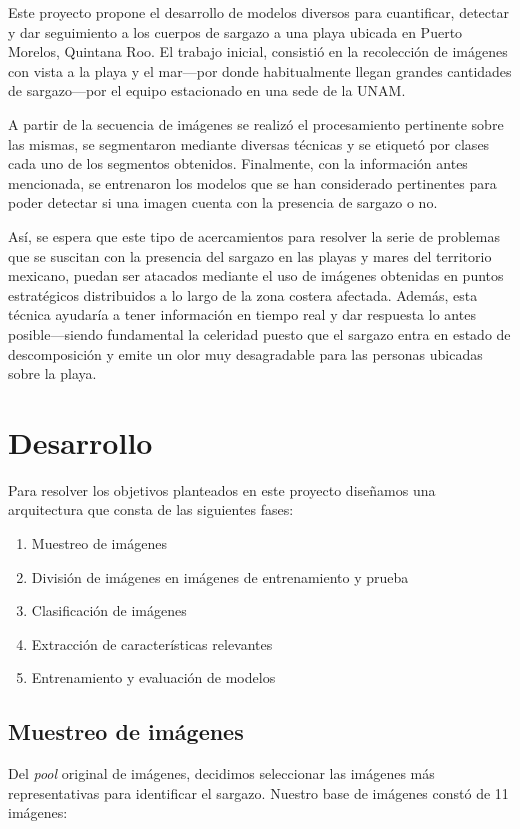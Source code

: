 \documentclass[conference]{IEEEtran}
\begin{document}
Este proyecto propone el desarrollo de modelos diversos para cuantificar, detectar y dar seguimiento a los cuerpos de sargazo a una playa ubicada en Puerto Morelos, Quintana Roo. El trabajo inicial, consistió en la recolección de imágenes con vista a la playa y el mar---por donde habitualmente llegan grandes cantidades de sargazo---por el equipo estacionado en una sede de la UNAM.

A partir de la secuencia de imágenes se realizó el procesamiento pertinente sobre las mismas, se segmentaron mediante diversas técnicas y se etiquetó por clases cada uno de los segmentos obtenidos. Finalmente, con la información antes mencionada, se entrenaron los modelos que se han considerado pertinentes para poder detectar si una imagen cuenta con la presencia de sargazo o no.

Así, se espera que este tipo de acercamientos para resolver la serie de problemas que se suscitan con la presencia del sargazo en las playas y mares del territorio mexicano, puedan ser atacados mediante el uso de imágenes obtenidas en puntos estratégicos distribuidos a lo largo de la zona costera afectada. Además, esta técnica ayudaría a tener información en tiempo real y dar respuesta lo antes posible---siendo fundamental la celeridad puesto que el sargazo entra en estado de descomposición y emite un olor muy desagradable para las personas ubicadas sobre la playa.




\section{Desarrollo}
Para resolver los objetivos planteados en este proyecto diseñamos una arquitectura que consta de las siguientes fases:

\begin{enumerate}
    \item Muestreo de imágenes
    \item División de imágenes en imágenes de entrenamiento y prueba
    \item Clasificación de imágenes
    \item Extracción de características relevantes
    \item Entrenamiento y evaluación de modelos 
\end{enumerate}

\subsection{Muestreo de imágenes}
Del \textit{pool} original de imágenes, decidimos seleccionar las imágenes más representativas para identificar el sargazo. Nuestro base de imágenes constó de 11 imágenes: 
\end{document}
